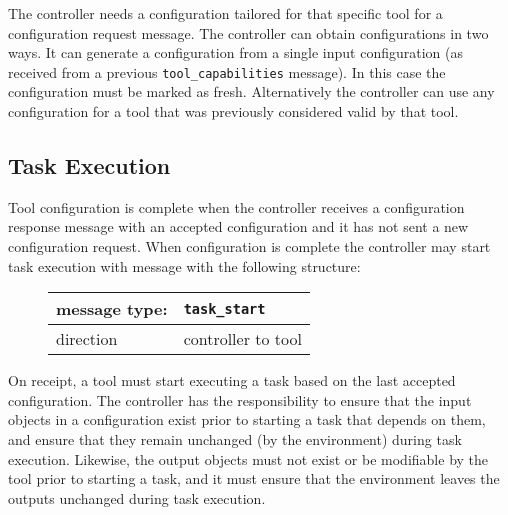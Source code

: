 \documentclass{article}
\newcommand{\msg}[1]{\texttt{#1}}
\begin{document}
   The controller needs a configuration tailored for that specific tool for a
   configuration request message.  The controller can obtain configurations in
   two ways.  It can generate a configuration from a single input configuration
   (as received from a previous \msg{tool\_capabilities} message). In this case
   the configuration must be marked as fresh. Alternatively the controller can
   use any configuration for a tool that was previously considered valid by
   that tool.


  \subsection{Task Execution} \label{ss::task_execution}

   \noindent Tool configuration is complete when the controller receives a
   configuration response message with an accepted configuration and it has not
   sent a new configuration request.  When configuration is complete the
   controller may start task execution with message with the following
   structure: 

   \begin{figure}[H]
    \begin{center}
     \begin{tabular}{|ll|}
      \hline
       message type:   & \msg{task\_start} \\
      \hline
       direction       & controller to tool \\
      \hline
     \end{tabular}
    \end{center}
   \end{figure}

   \noindent On receipt, a tool must start executing a task based on the last
   accepted configuration. The controller has the responsibility to ensure that
   the input objects in a configuration exist prior to starting a task that
   depends on them, and ensure that they remain unchanged (by the environment)
   during task execution. Likewise, the output objects must not exist or be
   modifiable by the tool prior to starting a task, and it must ensure that the
   environment leaves the outputs unchanged during task execution.
\end{document}

